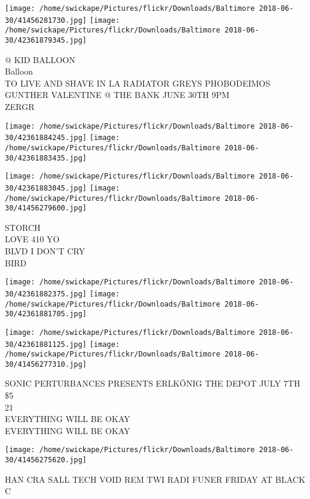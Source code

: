 \documentclass[10pt,letterpaper]{article}
\begin{document}
\texttt{[image: /home/swickape/Pictures/flickr/Downloads/Baltimore 2018-06-30/41456281730.jpg]}
\texttt{[image: /home/swickape/Pictures/flickr/Downloads/Baltimore 2018-06-30/42361879345.jpg]}

@ KID BALLOON\\
Balloon\\
TO LIVE AND SHAVE IN LA RADIATOR GREYS PHOBODEIMOS GUNTHER VALENTINE @ THE BANK JUNE 30TH 9PM\\
ZERGR\\
\pagebreak

\texttt{[image: /home/swickape/Pictures/flickr/Downloads/Baltimore 2018-06-30/42361884245.jpg]}
\texttt{[image: /home/swickape/Pictures/flickr/Downloads/Baltimore 2018-06-30/42361883435.jpg]}

\texttt{[image: /home/swickape/Pictures/flickr/Downloads/Baltimore 2018-06-30/42361883045.jpg]}
\texttt{[image: /home/swickape/Pictures/flickr/Downloads/Baltimore 2018-06-30/41456279600.jpg]}

STORCH\\
LOVE 410 YO\\
BLVD I DON'T CRY\\
BIRD\\
\pagebreak

\texttt{[image: /home/swickape/Pictures/flickr/Downloads/Baltimore 2018-06-30/42361882375.jpg]}
\texttt{[image: /home/swickape/Pictures/flickr/Downloads/Baltimore 2018-06-30/42361881705.jpg]}

\texttt{[image: /home/swickape/Pictures/flickr/Downloads/Baltimore 2018-06-30/42361881125.jpg]}
\texttt{[image: /home/swickape/Pictures/flickr/Downloads/Baltimore 2018-06-30/41456277310.jpg]}

SONIC PERTURBANCES PRESENTS ERLKÖNIG THE DEPOT JULY 7TH \$5\\
21\\
EVERYTHING WILL BE OKAY\\
EVERYTHING WILL BE OKAY\\
\pagebreak

\texttt{[image: /home/swickape/Pictures/flickr/Downloads/Baltimore 2018-06-30/41456275620.jpg]}

HAN CRA SALL TECH VOID REM TWI RADI FUNER FRIDAY AT BLACK C\\
\pagebreak
\end{document}
